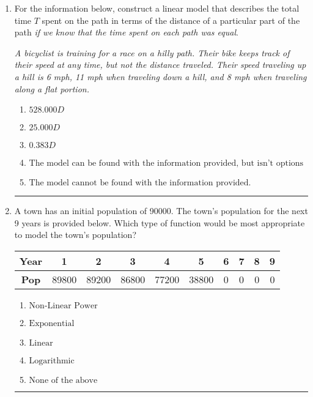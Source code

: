 \documentclass[14pt]{extbook}
\newcommand{\litem}[1]{\item#1\hspace*{-1cm}\rule{\textwidth}{0.4pt}}
\begin{document}
\begin{enumerate}
{\begin{enumerate}[label=\Alph*.]
\end{enumerate} }
\litem{
For the information below, construct a linear model that describes the total time $T$ spent on the path in terms of the distance of a particular part of the path \textit{if we know that the time spent on each path was equal}.
\begin{center}
    \textit{ A bicyclist is training for a race on a hilly path. Their bike keeps track of their speed at any time, but not the distance traveled. Their speed traveling up a hill is 6 mph, 11 mph when traveling down a hill, and 8 mph when traveling along a flat portion. }
\end{center}
\begin{enumerate}[label=\Alph*.]
\item \( 528.000 D \)
\item \( 25.000 D \)
\item \( 0.383 D \)
\item \( \text{The model can be found with the information provided, but isn't options 1-3.} \)
\item \( \text{The model cannot be found with the information provided.} \)

\end{enumerate} }
\litem{
A town has an initial population of 90000. The town's population for the next 9 years is provided below. Which type of function would be most appropriate to model the town's population?

\begin{tabular}{c|c|c|c|c|c|c|c|c|c}
\textbf{Year} &1 &2 &3 &4 &5 &6 &7 &8 &9\tabularnewline \hline
\textbf{Pop} &89800 &89200 &86800 &77200 &38800 &0 &0 &0 &0\end{tabular}\begin{enumerate}[label=\Alph*.]
\item \( \text{Non-Linear Power} \)
\item \( \text{Exponential} \)
\item \( \text{Linear} \)
\item \( \text{Logarithmic} \)
\item \( \text{None of the above} \)


\end{enumerate}}
\end{enumerate}
\end{document}
